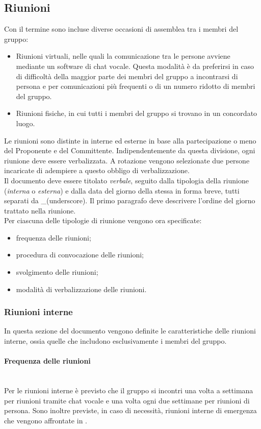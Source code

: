 \subsection{Riunioni}
Con il termine  sono incluse diverse occasioni di assemblea tra i membri del gruppo:
\begin{itemize}
\item Riunioni virtuali, nelle quali la comunicazione tra le persone avviene mediante un software di chat vocale. Questa modalità è da preferirsi in caso di difficoltà della maggior parte dei membri del gruppo a incontrarsi di persona e per comunicazioni più frequenti o di un numero ridotto di membri del gruppo.
\item Riunioni fisiche, in cui tutti i membri del gruppo si trovano in un concordato luogo.	
\end{itemize}
Le riunioni sono distinte in interne ed esterne in base alla partecipazione o meno del Proponente e del Committente. Indipendentemente da questa divisione, ogni riunione deve essere verbalizzata. A rotazione vengono selezionate due persone incaricate di adempiere a questo obbligo di verbalizzazione.\\
Il documento deve essere titolato \textit{verbale}, seguito dalla tipologia della riunione (\textit{interna} o \textit{esterna}) e dalla data del giorno della stessa in forma breve, tutti separati da \_(underscore). Il primo paragrafo deve descrivere l'ordine del giorno trattato nella riunione.\\
Per ciascuna delle tipologie di riunione vengono ora specificate:
\begin{itemize}
	\item frequenza delle riunioni;
	\item procedura di convocazione delle riunioni;
	\item svolgimento delle riunioni;
	\item modalità di verbalizzazione delle riunioni.	 
\end{itemize}

\subsubsection{Riunioni interne}
In questa sezione del documento vengono definite le caratteristiche delle riunioni interne, ossia quelle che includono esclusivamente i membri del gruppo.

\paragraph{Frequenza delle riunioni}\mbox{}\\
Per le riunioni interne è previsto che il gruppo si incontri una volta a settimana per riunioni tramite chat vocale e una volta ogni due settimane per riunioni di persona. Sono inoltre previste, in caso di necessità, riunioni interne di emergenza che vengono affrontate in .

